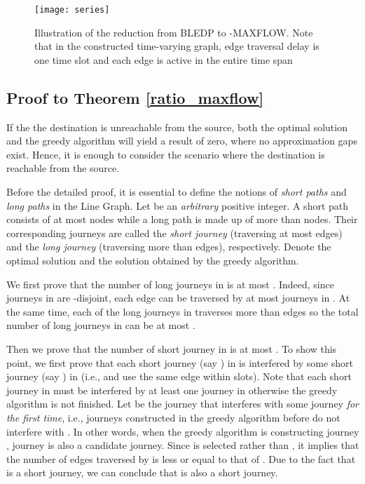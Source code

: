 \documentclass[10pt, conference, letterpaper]{IEEEtran}
\begin{document}
\begin{figure}[tbp]
\begin{center}
\texttt{[image: series]}
\caption{Illustration of the reduction from BLEDP to -MAXFLOW. Note that in the constructed time-varying graph, edge traversal delay is one time slot and each edge is active in the entire time span }
\label{series}\vspace{-5mm}
\end{center}
\end{figure}
\subsection{Proof to Theorem \ref{ratio_maxflow}}\label{proof_ratio_maxflow}
If the the destination is unreachable from the source, both the optimal solution and the greedy algorithm will yield a result of zero, where no approximation gaps exist. Hence, it is enough to consider the scenario where the destination is reachable from the source.

Before the detailed proof, it is essential to define the notions of \emph{short paths} and \emph{long paths} in the Line Graph. Let  be an \emph{arbitrary} positive integer. A short path consists of at most  nodes while a long path is made up of more than  nodes. Their corresponding journeys are called the \emph{short journey} (traversing at most  edges) and the \emph{long journey} (traversing more than  edges), respectively. Denote  the optimal solution and  the solution obtained by the greedy algorithm.

We first prove that the number of long journeys in  is at most .  Indeed, since journeys in  are -disjoint, each edge can be traversed by at most  journeys in . At the same time, each of the long journeys in  traverses more than  edges so the total number of long journeys in  can be at most .


Then we prove that the number of short journey in  is at most . To show this point, we first prove that each short journey (say ) in  is interfered by some short journey (say ) in  (i.e.,  and  use the same edge within  slots). Note that each short journey in  must be interfered by at least one journey in  otherwise the greedy algorithm is not finished. Let  be the journey that interferes with some journey  \emph{for the first time}, i.e., journeys constructed in the greedy algorithm before  do not interfere with . In other words, when the greedy algorithm is constructing journey , journey  is also a candidate journey. Since  is selected rather than , it implies that the number of edges traversed by  is less or equal to that of . Due to the fact that  is a short journey, we can conclude that  is also a short journey.
\end{document}
